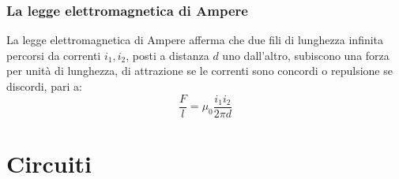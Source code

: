 \documentclass{article}
\begin{document}
\subsubsection{La legge elettromagnetica di Ampere}
La legge elettromagnetica di Ampere afferma che due fili di lunghezza infinita percorsi da correnti $i_1,i_2$, posti a distanza $d$ uno dall'altro, subiscono una forza per unità di lunghezza, di attrazione se le correnti sono concordi o repulsione se discordi, pari a:
\begin{equation}
    \frac{F}{l}=\mu_0 \frac{i_1 i_2}{2\pi d}
\end{equation}



\section{Circuiti}
\end{document}
